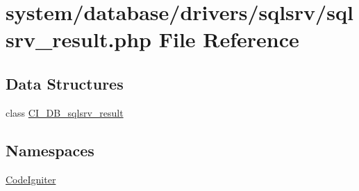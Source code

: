 \hypertarget{sqlsrv__result_8php}{}\section{system/database/drivers/sqlsrv/sqlsrv\+\_\+result.php File Reference}
\label{sqlsrv__result_8php}
\subsection*{Data Structures}
\begin{DoxyCompactItemize}
\item 
class \mbox{\hyperlink{class_c_i___d_b__sqlsrv__result}{C\+I\+\_\+\+D\+B\+\_\+sqlsrv\+\_\+result}}
\end{DoxyCompactItemize}
\subsection*{Namespaces}
\begin{DoxyCompactItemize}
\item 
 \mbox{\hyperlink{namespace_code_igniter}{Code\+Igniter}}
\end{DoxyCompactItemize}
